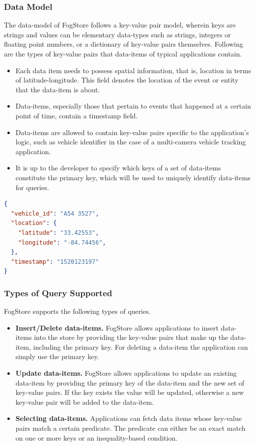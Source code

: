 \subsubsection{Data Model}
The data-model of FogStore follows a key-value pair model, wherein keys are strings and values can be elementary data-types such as strings, integers or floating point numbers, or a dictionary of key-value pairs themselves. Following are the types of key-value pairs that data-items of typical applications contain.
\begin{itemize}
\item Each data item needs to possess spatial information, that is, location in terms of latitude-longitude. This field denotes the location of the event or entity that the data-item is about.
\item Data-items, especially those that pertain to events that happened at a certain point of time, contain a timestamp field.
\item Data-items are allowed to contain key-value pairs specific to the application's logic, such as vehicle identifier in the case of a multi-camera vehicle tracking application.
\item It is up to the developer to specify which keys of a set of data-items constitute the primary key, which will be used to uniquely identify data-items for queries.
\end{itemize}

\begin{lstlisting}[caption={A sample data-item that captures a spatio-temporal event in the vehicle-tracking application's detection set. The field storing Vehicle ID forms the key that will be used to retrieve detections of a particular vehicle.},captionpos=b,label={lst:listing1},language=Json]
{
  "vehicle_id": "A54 3527",
  "location": {
    "latitude": "33.42553",
    "longitude": "-84.74456",
  },
  "timestamp": "1520123197"
}
\end{lstlisting}

\subsubsection{Types of Query Supported}
FogStore supports the following types of queries.
\begin{itemize}
\item \textbf{Insert/Delete data-items. } FogStore allows applications to insert data-items into the store by providing the key-value pairs that make up the data-item, including the primary key. For deleting a data-item the application can simply use the primary key.
\item \textbf{Update data-items. } FogStore allows applications to update an existing data-item by providing the primary key of the data-item and the new set of key-value pairs. If the key exists the value will be updated, otherwise a new key-value pair will be added to the data-item.
\item \textbf{Selecting data-items. } Applications can fetch data items whose key-value pairs match a certain predicate. The predicate can either be an exact match on one or more keys or an inequality-based condition.
\end{itemize}

